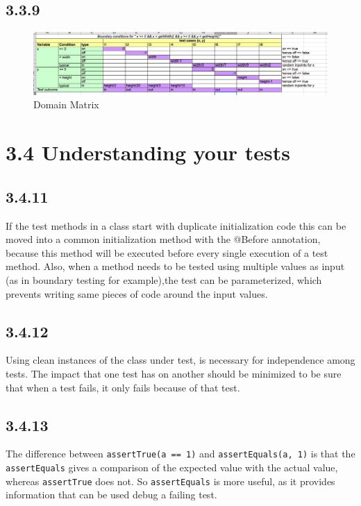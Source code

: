 \documentclass[]{article}
\begin{document}
\subsection{3.3.9}\label{section-5}

\begin{figure}
\centering
\includegraphics{3.3.9_domain_matrix.png}
\caption{Domain Matrix}
\end{figure}

\section{3.4 Understanding your tests}\label{understanding-your-tests}

\subsection{3.4.11}\label{section-6}

If the test methods in a class start with duplicate initialization code
this can be moved into a common initialization method with the @Before
annotation, because this method will be executed before every single
execution of a test method. Also, when a method needs to be tested using
multiple values as input (as in boundary testing for example),the test
can be parameterized, which prevents writing same pieces of code around
the input values.

\subsection{3.4.12}\label{section-7}

Using clean instances of the class under test, is necessary for
independence among tests. The impact that one test has on another should
be minimized to be sure that when a test fails, it only fails because of
that test.

\subsection{3.4.13}\label{section-8}

The difference between \texttt{assertTrue(a\ ==\ 1)} and
\texttt{assertEquals(a,\ 1)} is that the \texttt{assertEquals} gives a
comparison of the expected value with the actual value, whereas
\texttt{assertTrue} does not. So \texttt{assertEquals} is more useful,
as it provides information that can be used debug a failing test.
\end{document}
